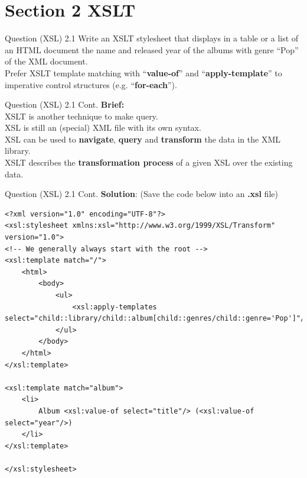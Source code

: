 \section*{Section 2 XSLT}
\begin{frame}[fragile]{Question (XSL) 2.1}
Write an XSLT stylesheet that displays in a table or a list of an HTML document the name and released year of the albums with genre “Pop” of the XML document.\\\vspace{5pt}
Prefer XSLT template matching with ``\textbf{value-of}'' and ``\textbf{apply-template}'' to imperative control structures (e.g. ``\textbf{for-each}'').\\\vspace{10pt}

\end{frame}

\begin{frame}[fragile]{Question (XSL) 2.1 Cont.}
\textbf{Brief:}\\\vspace{10pt}
XSLT is another technique to make query.\\\vspace{5pt}
XSL is still an (special) XML file with its own syntax.\\ \vspace{5pt}
XSL can be used to \textbf{navigate}, \textbf{query} and \textbf{transform} the data in the XML library.\\\vspace{5pt}
XSLT describes the \textbf{transformation process} of a given XSL over the existing data. 
\end{frame}

\begin{frame}[fragile]{Question (XSL) 2.1 Cont.}
\textbf{Solution}: (Save the code below into an \textbf{.xsl} file)\\
\begin{lstlisting}[style=xml-small-nomargin]
<?xml version="1.0" encoding="UTF-8"?>
<xsl:stylesheet xmlns:xsl="http://www.w3.org/1999/XSL/Transform" version="1.0">
<!-- We generally always start with the root -->
<xsl:template match="/">
	<html>
		<body>
			<ul>
				<xsl:apply-templates select="child::library/child::album[child::genres/child::genre='Pop']"/>
			</ul>
		</body>
	</html>
</xsl:template>

<xsl:template match="album">
	<li>
		Album <xsl:value-of select="title"/> (<xsl:value-of select="year"/>)
	</li>
</xsl:template>

</xsl:stylesheet>
\end{lstlisting}\vspace{5pt}

\end{frame}


